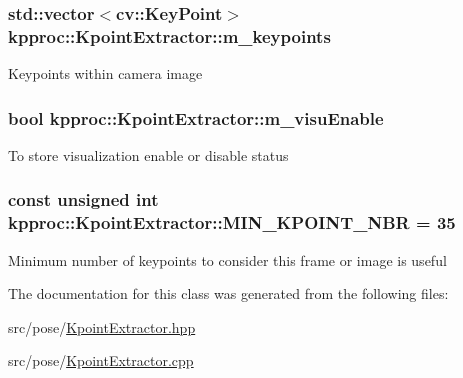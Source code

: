 \subsubsection[{\texorpdfstring{m\+\_\+keypoints}{m_keypoints}}]{\setlength{\rightskip}{0pt plus 5cm}std\+::vector$<$cv\+::\+Key\+Point$>$ kpproc\+::\+Kpoint\+Extractor\+::m\+\_\+keypoints\hspace{0.3cm}{\ttfamily [private]}}\hypertarget{classkpproc_1_1KpointExtractor_ace5a9a7c0bc1cea6e181b72f41588205}{}\label{classkpproc_1_1KpointExtractor_ace5a9a7c0bc1cea6e181b72f41588205}
Keypoints within camera image 
\subsubsection[{\texorpdfstring{m\+\_\+visu\+Enable}{m_visuEnable}}]{\setlength{\rightskip}{0pt plus 5cm}bool kpproc\+::\+Kpoint\+Extractor\+::m\+\_\+visu\+Enable\hspace{0.3cm}{\ttfamily [private]}}\hypertarget{classkpproc_1_1KpointExtractor_ab0f534203a246814b163aa3dffeef1b5}{}\label{classkpproc_1_1KpointExtractor_ab0f534203a246814b163aa3dffeef1b5}
To store visualization enable or disable status 
\subsubsection[{\texorpdfstring{M\+I\+N\+\_\+\+K\+P\+O\+I\+N\+T\+\_\+\+N\+BR}{MIN_KPOINT_NBR}}]{\setlength{\rightskip}{0pt plus 5cm}const unsigned int kpproc\+::\+Kpoint\+Extractor\+::\+M\+I\+N\+\_\+\+K\+P\+O\+I\+N\+T\+\_\+\+N\+BR = 35\hspace{0.3cm}{\ttfamily [static]}}\hypertarget{classkpproc_1_1KpointExtractor_a1d7c3437fc6b2cff35d60df9f554dd12}{}\label{classkpproc_1_1KpointExtractor_a1d7c3437fc6b2cff35d60df9f554dd12}
Minimum number of keypoints to consider this frame or image is useful 

The documentation for this class was generated from the following files\+:\begin{DoxyCompactItemize}
\item 
src/pose/\hyperlink{KpointExtractor_8hpp}{Kpoint\+Extractor.\+hpp}\item 
src/pose/\hyperlink{KpointExtractor_8cpp}{Kpoint\+Extractor.\+cpp}\end{DoxyCompactItemize}
